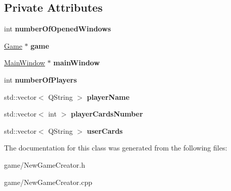 \subsection*{Private Attributes}
\begin{DoxyCompactItemize}
\item 
\mbox{\label{classNewGameCreator_ad6c9525b56ae5262e001234963134eed}} 
int {\bfseries number\+Of\+Opened\+Windows}
\item 
\mbox{\label{classNewGameCreator_a04cf8166bfa23a8b42af83fdf7aba40b}} 
\hyperlink{classGame}{Game} $\ast$ {\bfseries game}
\item 
\mbox{\label{classNewGameCreator_aefa06e71c9f9fb3112daba05eeba7766}} 
\hyperlink{classMainWindow}{Main\+Window} $\ast$ {\bfseries main\+Window}
\item 
\mbox{\label{classNewGameCreator_ac915dc1d2da341179a23ec805f94de9f}} 
int {\bfseries number\+Of\+Players}
\item 
\mbox{\label{classNewGameCreator_ae916a350032c1a8ad794e92082fb3b3c}} 
std\+::vector$<$ Q\+String $>$ {\bfseries player\+Name}
\item 
\mbox{\label{classNewGameCreator_a4d126ba7155fc11d1f801be52fe6152d}} 
std\+::vector$<$ int $>$ {\bfseries player\+Cards\+Number}
\item 
\mbox{\label{classNewGameCreator_afe39c8c4ae8bff26abff92bbf692265c}} 
std\+::vector$<$ Q\+String $>$ {\bfseries user\+Cards}
\end{DoxyCompactItemize}


The documentation for this class was generated from the following files\+:\begin{DoxyCompactItemize}
\item 
game/New\+Game\+Creator.\+h\item 
game/New\+Game\+Creator.\+cpp\end{DoxyCompactItemize}
